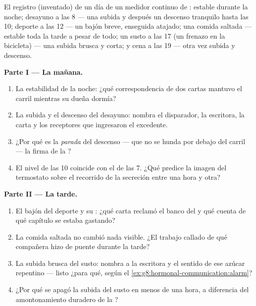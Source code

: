 \begin{problem}\label{pb:g8:hormonal-communication:1}
El registro (inventado) de un día de un medidor continuo de :
estable durante la noche; desayuno a las 8 --- una subida y después un
descenso tranquilo hasta las 10; deporte a las 12 --- un bajón breve,
enseguida atajado; una comida saltada --- estable toda la tarde a pesar
de todo; un susto a las 17 (un frenazo en la bicicleta) --- una subida
brusca y corta; y cena a las 19 --- otra vez subida y descenso.

\medskip\noindent\textbf{Parte I --- La mañana.}
\begin{enumerate}
  \item La estabilidad de la noche: ¿qué correspondencia de dos cartas
        mantuvo el carril mientras su dueña dormía?
  \item La subida y el descenso del desayuno: nombra el disparador, la
        escritora, la carta y los receptores que ingresaron el
        excedente.
  \item ¿Por qué es la \emph{parada} del descenso --- que no se hunda
        por debajo del carril --- la firma de la ?
  \item El nivel de las 10 coincide con el de las 7. ¿Qué predice la
        imagen del termostato sobre el recorrido de la secreción entre
        una hora y otra?
\end{enumerate}

\medskip\noindent\textbf{Parte II --- La tarde.}
\begin{enumerate}[resume]
  \item El bajón del deporte y su : ¿qué carta reclamó el
        banco del  y qué cuenta de qué capítulo se estaba
        gastando?
  \item La comida saltada no cambió nada visible. ¿El trabajo callado
        de qué  compañera hizo de puente durante la tarde?
  \item La subida brusca del susto: nombra a la escritora y el sentido
        de ese azúcar repentino --- listo ¿para qué, según el
        \cref{ex:g8:hormonal-communication:alarm}?
  \item ¿Por qué se apagó la subida del susto en menos de una hora, a
        diferencia del amontonamiento duradero de la ?
\end{enumerate}


\end{problem}

